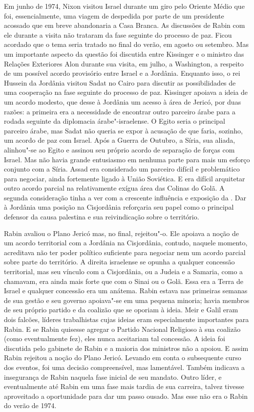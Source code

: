 Em junho de 1974, Nixon visitou Israel durante um giro pelo Oriente Médio
que foi, essencialmente, uma viagem de despedida por parte de um
presidente acossado que em breve abandonaria a Casa Branca. As
discussões de Rabin com ele durante a visita não trataram da fase
seguinte do processo de paz. Ficou acordado que o tema seria tratado no
final do verão, em agosto ou setembro. Mas um importante aspecto da
questão foi discutida entre Kissinger e o ministro das Relações
Exteriores Alon durante sua visita, em julho, a Washington,
a respeito de um possível acordo provisório entre Israel e a
Jordânia. Enquanto isso, o rei Hussein da Jordânia visitou Sadat no
Cairo para discutir as possibilidades de uma cooperação na fase seguinte
do processo de paz. Kissinger apoiava a ideia de um acordo modesto, que
desse à Jordânia um acesso à área de Jericó, por duas razões: a primeira
era a necessidade de encontrar outro parceiro árabe para a rodada
seguinte da diplomacia árabe"-israelense. O Egito seria o principal
parceiro árabe, mas Sadat não queria se expor à acusação de que faria,
sozinho, um acordo de paz com Israel. Após a Guerra de Outubro, a Síria,
sua aliada, alinhou"-se ao Egito e assinou seu próprio acordo
de separação de forças com Israel. Mas não havia grande entusiasmo em
nenhuma parte para mais um esforço conjunto com a Síria. Assad era
considerado um parceiro difícil e problemático para negociar, ainda
fortemente ligado à União Soviética. E era difícil arquitetar outro
acordo parcial na relativamente exígua área das Colinas do Golã. A
segunda consideração tinha a ver com a crescente influência e exposição
da . Dar à Jordânia uma posição na Cisjordânia reforçaria seu papel
como o principal defensor da causa palestina e sua reivindicação sobre o
território.

Rabin avaliou o Plano Jericó mas, no final, rejeitou"-o. Ele apoiava a
noção de um acordo territorial com a Jordânia na Cisjordânia, contudo,
naquele momento, acreditava não ter poder político suficiente para
negociar nem um acordo parcial sobre parte do território. A direita
israelense se opunha a qualquer concessão territorial, mas seu vínculo
com a Cisjordânia, ou a Judeia e a Samaria, como a chamavam, era ainda
mais forte que com o Sinai ou o Golã. Essa era a Terra de Israel e
qualquer concessão era um anátema. Rabin estava nas primeiras semanas de
sua gestão e seu governo apoiava"-se em uma pequena minoria; havia
membros de seu próprio partido e da coalizão que se oporiam à ideia.
Meir e Galil eram dois falcões, líderes trabalhistas cujas ideias eram
especialmente importantes para Rabin. E se Rabin quisesse agregar o
Partido Nacional Religioso à sua coalizão (como eventualmente fez),
eles nunca aceitariam tal concessão. A ideia foi discutida pelo gabinete
de Rabin e a maioria dos ministros não a apoiou. E assim Rabin rejeitou
a noção do Plano Jericó. Levando em conta o subsequente curso dos
eventos, foi uma decisão compreensível, mas lamentável. Também indicava
a insegurança de Rabin naquela fase inicial de seu mandato. Outro líder,
e eventualmente até Rabin em uma fase mais tardia de sua carreira, talvez
tivesse aproveitado a oportunidade para dar um passo ousado. Mas esse
não era o Rabin do verão de 1974.

